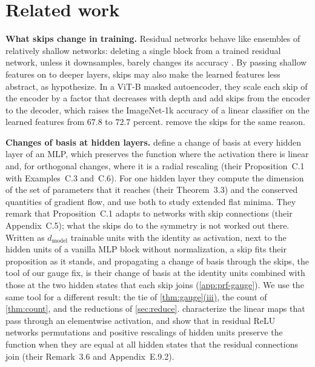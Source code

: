 \documentclass[10pt]{article}
\theoremstyle{definition}
\theoremstyle{remark}
\newcommand{\dm}{d_{\mathrm{model}}}
\newcommand{\para}[1]{\smallskip\noindent\textbf{#1}\hspace{0.5em}}
\DeclareRobustCommand{\cpref}[2]{\hyperref[#1:#2]{\cref*{#1}(#2)}}
\begin{document}
\section{Related work}\label{sec:related}

\para{What skips change in training.} Residual networks behave like ensembles of relatively shallow networks: deleting a single block from a trained residual network, unless it downsamples, barely changes its accuracy \citep{veit2016ensembles}. By passing shallow features on to deeper layers, skips may also make the learned features less abstract, as \citet{zhang2026residual} hypothesize. In a ViT-B masked autoencoder, they scale each skip of the encoder by a factor that decreases with depth and add skips from the encoder to the decoder, which raises the ImageNet-1k accuracy of a linear classifier on the learned features from $67.8$ to $72.7$ percent. \citet{ji2026cutting} remove the skips for the same reason.

\para{Changes of basis at hidden layers.} \citet{zhao2023symmetries} define a change of basis at every hidden layer of an MLP, which preserves the function where the activation there is linear and, for orthogonal changes, where it is a radial rescaling (their Proposition~C.1 with Examples~C.3 and~C.6). For one hidden layer they compute the dimension of the set of parameters that it reaches (their Theorem~3.3) and the conserved quantities of gradient flow, and use both to study extended flat minima. They remark that Proposition~C.1 adapts to networks with skip connections (their Appendix~C.5); what the skips do to the symmetry is not worked out there. Written as $\dm$ trainable units with the identity as activation, next to the hidden units of a vanilla MLP block without normalization, a skip fits their proposition as it stands, and propagating a change of basis through the skips, the tool of our gauge fix, is their change of basis at the identity units combined with those at the two hidden states that each skip joins (\cref{app:prf-gauge}). We use the same tool for a different result: the tie of \cpref{thm:gauge}{iii}, the count of \cref{thm:count}, and the reductions of \cref{sec:reduce}. \citet{godfrey2022symmetries} characterize the linear maps that pass through an elementwise activation, and show that in residual ReLU networks permutations and positive rescalings of hidden units preserve the function when they are equal at all hidden states that the residual connections join (their Remark~3.6 and Appendix~E.9.2).
\end{document}
